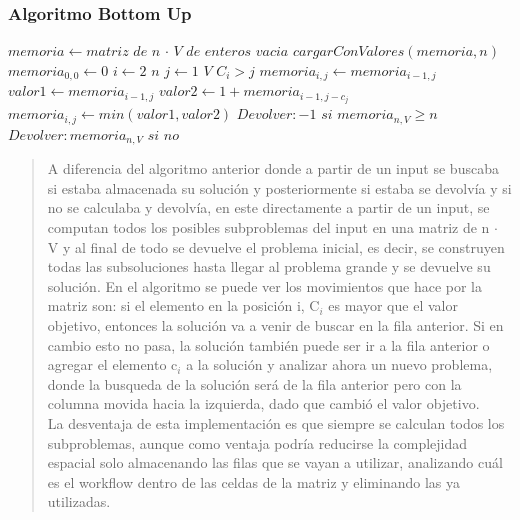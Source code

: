 \documentclass[7pt,a4paper]{article}
\begin{document}
\subsubsection{Algoritmo Bottom Up}
\begin{codebox}
\li $memoria \gets matriz$ $de$ $n$ $\cdot$ $V$ $de$ $enteros$ $vacia$
\li $cargarConValores(memoria,n)$
\li $memoria_{0,0} \gets 0$
\li \For $i \gets 2$ \To $n$
\li	 	\For $j \gets 1$ \To $V$
\li 		\If $C_{i} > j$ \Then
\li 			$memoria_{i,j} \gets memoria_{i-1,j}$
\li 	\Else
\li 			$valor1 \gets memoria_{i-1,j}$
\li 			$valor2 \gets 1 + memoria_{i-1,j-c_{j}} $
\li 			$memoria_{i,j} \gets min(valor1,valor2)$ 
		\End	
	\End  
\End
\li $Devolver: -1$  $si$ $memoria_{n,V} \geq n$
\li $Devolver: memoria_{n,V}$ $si$ $no$

\end{codebox}
\begin{verse}
A diferencia del algoritmo anterior donde a partir de un input se buscaba si estaba almacenada su solución y posteriormente si estaba se devolvía y si no se calculaba y devolvía, en este directamente a partir de un input, se computan todos los posibles subproblemas del input en una matriz de n $\cdot$ V y al final de todo se devuelve el problema inicial, es decir, se construyen todas las subsoluciones hasta llegar al problema grande y se devuelve su solución. En el algoritmo se puede ver los movimientos que hace por la matriz son: si el elemento en la posición i, C$_{i}$ es mayor que el valor objetivo, entonces la  solución va a venir de buscar en la fila anterior. Si en cambio esto no pasa, la solución también puede ser ir a la fila anterior o agregar el elemento c$_{i}$ a la solución y analizar ahora un nuevo problema, donde la busqueda de la solución será de la fila anterior pero con la columna movida hacia la izquierda, dado que cambió el valor objetivo. 
\\
La desventaja de esta implementación es que siempre se calculan todos los subproblemas, aunque como ventaja podría reducirse la complejidad espacial solo almacenando las filas que se vayan a utilizar, analizando cuál es el workflow dentro de las celdas de la matriz y eliminando las ya utilizadas.
\end{verse}
\end{document}
